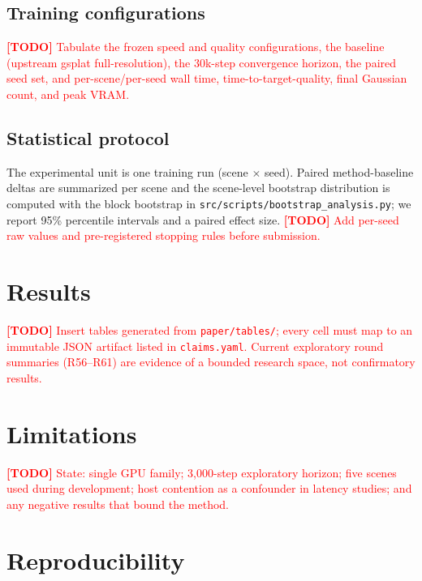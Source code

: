 \documentclass[11pt,letterpaper]{article}
\newcommand{\TODO}[1]{\textcolor{red}{\textbf{[TODO] }#1}}
\begin{document}
\subsection{Training configurations}

\TODO{Tabulate the frozen speed and quality configurations, the baseline
(upstream gsplat full-resolution), the 30k-step convergence horizon, the
paired seed set, and per-scene/per-seed wall time, time-to-target-quality,
final Gaussian count, and peak VRAM.}

\subsection{Statistical protocol}

The experimental unit is one training run (scene $\times$ seed). Paired
method-baseline deltas are summarized per scene and the scene-level bootstrap
distribution is computed with the block bootstrap in
\texttt{src/scripts/bootstrap\_analysis.py}; we report 95\% percentile
intervals and a paired effect size. \TODO{Add per-seed raw values and
pre-registered stopping rules before submission.}

\section{Results}

\label{sec:results}

\TODO{Insert tables generated from \texttt{paper/tables/}; every cell must map
to an immutable JSON artifact listed in \texttt{claims.yaml}. Current
exploratory round summaries (R56--R61) are evidence of a bounded research
space, not confirmatory results.}

\section{Limitations}

\label{sec:limitations}

\TODO{State: single GPU family; 3,000-step exploratory horizon; five scenes
used during development; host contention as a confounder in latency studies;
and any negative results that bound the method.}

\section{Reproducibility}

\label{sec:reproducibility}
\end{document}
